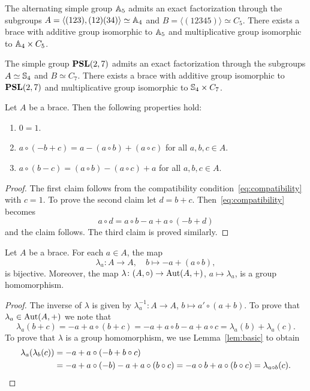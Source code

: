 \begin{example} 
	\label{exa:a5a4c5}
	The alternating simple group $\mathbb{A}_5$ admits an exact factorization
  through the subgroups 
  $A=\langle (123),(12)(34)\rangle\simeq\mathbb{A}_4$ and 
  $B=\langle(12345)\rangle\simeq C_5$.  
  There exists a brace with additive group isomorphic to $\mathbb{A}_5$ and multiplicative
  group isomorphic to $\mathbb{A}_4\times C_5$. 
\end{example}

\begin{example} 
	\label{exa:PSL27S4C7}
  The simple group $\mathbf{PSL}(2,7)$ admits an exact factorization through
  the subgroups $A\simeq\mathbb{S}_4$ and $B\simeq C_7$. 
  There exists a brace with additive
  group isomorphic to $\mathbf{PSL}(2,7)$ and multiplicative group isomorphic to 
  $\mathbb{S}_4\times C_7$.  
\end{example}

\begin{lemma}
    \label{lem:basic}
	Let $A$ be a brace. Then the following properties hold:
    \begin{enumerate}
        \item $0=1$.  
        \item $a\circ(-b+c)=a-(a\circ b)+(a\circ c)$ for all $a,b,c\in A$.
        \item $a\circ(b-c)=(a\circ b)-(a\circ c)+a$ for all $a,b,c\in A$.
    \end{enumerate}
\end{lemma}

\begin{proof}
		The first claim follows from the compatibility condition~\eqref{eq:compatibility} with
		$c=1$.  To prove the second claim let $d=b+c$.
		Then~\eqref{eq:compatibility} becomes 
		\[
		a\circ d =a\circ b-a+a\circ (-b+d)
		\]
		and the claim follows. The third claim is
		proved similarly.
\end{proof}

\begin{proposition}
\label{pro:lambda}
    Let $A$ be a brace. For each $a\in A$, the map
    \[
        \lambda_a\colon A\to A,\quad
        b\mapsto -a+(a\circ b),
    \]
    is bijective. Moreover, the map 
    $\lambda\colon (A,\circ)\to\operatorname{Aut}(A,+)$, $a\mapsto\lambda_a$, is a group homomorphism. 
\end{proposition}

\begin{proof}
The inverse of $\lambda$ is given by $\lambda^{-1}_a\colon A\to A$, $b\mapsto a'\circ (a+b)$. To prove
that $\lambda_a\in\operatorname{Aut}(A,+)$ we note that
\[
\lambda_a(b+c)=-a+a\circ(b+c)=-a+a\circ b-a+a\circ c=\lambda_a(b)+\lambda_a(c).
\]
To prove that $\lambda$ is a group homomorphism, we 
use Lemma~\ref{lem:basic} to obtain
\begin{align*}
\lambda_a(\lambda_b(c))&=-a+a\circ (-b+b\circ c)\\
&=-a+a\circ(-b)-a+a\circ (b\circ c)=-a\circ b+a\circ (b\circ c)=\lambda_{a\circ b}(c).\qedhere    
\end{align*}
\end{proof}

